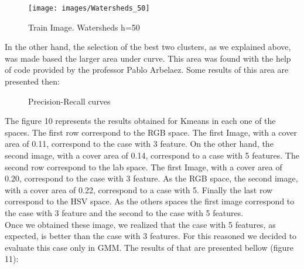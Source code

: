 \documentclass[10pt,twocolumn,letterpaper]{article}
\begin{document}
\begin{figure}[H] \centering \texttt{[image: images/Watersheds\_50]}\caption{Train Image. Watersheds h=50}\label{Comp}\end{figure}


In the other hand, the selection of the best two clusters, as we explained above, was made based the larger area under curve. This area was found with the help of code provided by the professor Pablo Arbelaez. Some results of this area are presented then:

\begin{figure}[H]
\centering
  \par
  \par
  \caption{Precision-Recall curves}
\end{figure}

The figure 10 represents the results obtained for Kmeans in each one of the spaces. The first row correspond to the RGB space. The first Image, with a cover area of 0.11,  correspond to the case with 3 feature. On the other hand, the second image, with a cover area of 0.14, correspond to a case with 5 features. The second row correspond to the lab space. The first Image, with a cover area of 0.20,  correspond to the case with 3 feature. As the RGB space, the second image, with a cover area of 0.22, correspond to a case with 5. Finally the last row correspond to the HSV space. As the others spaces the first image correspond to the case with 3 feature and the second to the case with 5 features.\\

Once we obtained these image, we realized that the case with 5 features, as expected, is better than the case with 3 features. For this reasoned we decided to evaluate this case only in GMM. The results of that are presented  bellow (figure 11):\\
\end{document}

